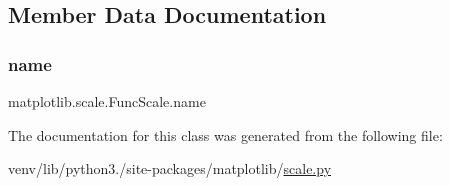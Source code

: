 \subsection{Member Data Documentation}
\mbox{\label{classmatplotlib_1_1scale_1_1FuncScale_a37288104c5c148f19d20359f716132e9}} 
\subsubsection{\texorpdfstring{name}{name}}
{\footnotesize\ttfamily matplotlib.\+scale.\+Func\+Scale.\+name\hspace{0.3cm}{\ttfamily [static]}}



The documentation for this class was generated from the following file\+:\begin{DoxyCompactItemize}
\item 
venv/lib/python3./site-\/packages/matplotlib/\hyperlink{scale_8py}{scale.\+py}\end{DoxyCompactItemize}
